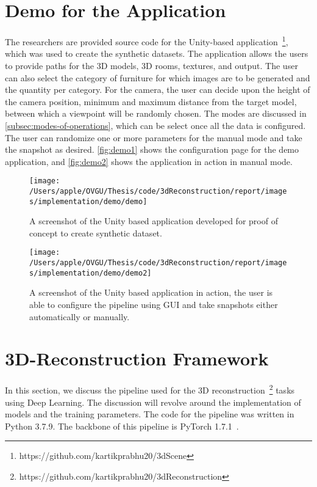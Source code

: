 \section{Demo for the Application}\label{sec:demo}

The researchers are provided source code for the Unity-based application~\footnote{https://github.com/kartikprabhu20/3dScene}, which was used to create the synthetic datasets.
The application allows the users to provide paths for the 3D models, 3D rooms, textures, and output.
The user can also select the category of furniture for which images are to be generated and the quantity per category.
For the camera, the user can decide upon the height of the camera position, minimum and maximum distance from the target model, between which a viewpoint will be randomly chosen.
The modes are discussed in \autoref{subsec:modes-of-operations}, which can be select once all the data is configured.
The user can randomize one or more parameters for the manual mode and take the snapshot as desired.
\autoref{fig:demo1} shows the configuration page for the demo application, and \autoref{fig:demo2} shows the application in action in manual mode.

\begin{figure}
    \centering
    \texttt{[image: /Users/apple/OVGU/Thesis/code/3dReconstruction/report/images/implementation/demo/demo]}
    \caption[User Interface for 3D-Scene Tool.]{A screenshot of the Unity based application developed for proof of concept to create synthetic dataset.}
    \label{fig:demo1}
\end{figure}

\begin{figure}
    \centering
    \texttt{[image: /Users/apple/OVGU/Thesis/code/3dReconstruction/report/images/implementation/demo/demo2]}
    \caption[Demo for 3D-Scene Tool.]{A screenshot of the Unity based application in action, the user is able to configure the pipeline using GUI and take snapshots either automatically or manually.}
    \label{fig:demo2}
\end{figure}

\section{3D-Reconstruction Framework}\label{sec:3d-reconstruction-framework}

In this section, we discuss the pipeline used for the 3D reconstruction~\footnote{https://github.com/kartikprabhu20/3dReconstruction} tasks using Deep Learning.
The discussion will revolve around the implementation of models and the training parameters.
The code for the pipeline was written in Python 3.7.9.
The backbone of this pipeline is PyTorch 1.7.1~\cite{NEURIPS2019_9015}.

